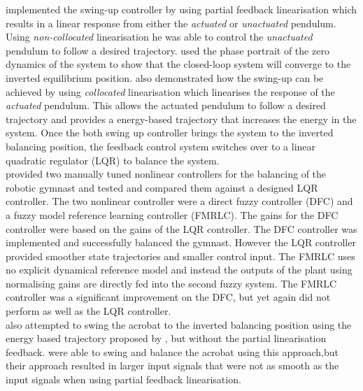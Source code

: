 \citet{spong_swingup} implemented the swing-up controller by using partial feedback linearisation which results in a linear response from either the \textit{actuated} or \textit{unactuated} pendulum. Using \textit{non-collocated} linearisation he was able to control the \textit{unactuated} pendulum to follow a desired trajectory. \citeauthor{spong_swingup} used the phase portrait of the zero dynamics of the system to show that the closed-loop system will converge to the inverted equilibrium position. \citeauthor{spong_swingup} also demonstrated how the swing-up can be achieved by using \textit{collocated} linearisation which linearises the response of the \textit{actuated} pendulum. This allows the actuated pendulum to follow a desired trajectory and \citeauthor{spong_swingup} provides a energy-based trajectory that increases the energy in the system. Once the both swing up controller brings the system to the inverted balancing position, the feedback control system switches over to a linear quadratic regulator (LQR) to balance the system.\\

\citet{Brown1997} provided two manually tuned nonlinear controllers for the balancing of the robotic gymnast and tested and compared them against a designed LQR controller. The two nonlinear controller were a direct fuzzy controller (DFC) and a fuzzy model reference learning controller (FMRLC). The gains for the DFC controller were based on the gains of the LQR controller. The DFC controller was implemented and successfully balanced the gymnast. However the LQR controller provided smoother state trajectories and smaller control input. The FMRLC uses no explicit dynamical reference model and instead the outputs of the plant using normalising gains are directly fed into the second fuzzy system. The FMRLC controller was a significant improvement on the DFC, but yet again did not perform as well as the LQR controller.\\


\citeauthor{Brown1997} also attempted to swing the acrobat to the inverted balancing position using the energy based trajectory proposed by \citeauthor{spong_swingup}, but without the partial linearisation feedback. \citeauthor{Brown1997} were able to swing and balance the acrobat using this approach,but their approach resulted in larger input signals that were not as smooth as the input signals when using partial feedback linearisation.\\



